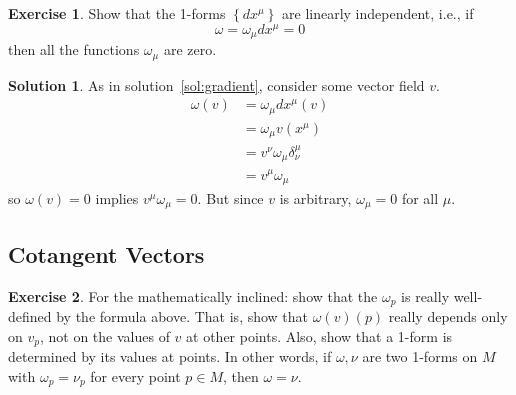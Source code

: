 \documentclass[11pt, a4paper]{article}
\theoremstyle{definition}
\newtheorem{ex}{Exercise}[part]
\newtheorem{sol}{Solution}[part]
\begin{document}
\begin{ex}

Show that the 1-forms $\left\{dx^\mu\right\}$ are linearly independent, i.e., if
\[
    \omega = \omega_\mu dx^\mu = 0
\]
then all the functions $\omega_\mu$ are zero.

\end{ex}

\begin{sol}

As in solution~\ref{sol:gradient}, consider some vector field $v$.
\begin{align*}
    \omega (v) &= \omega_\mu dx^\mu (v) \\
               &= \omega_\mu v(x^\mu) \\
               &= v^\nu \omega_\mu \delta_\nu^\mu \\
               &= v^\mu \omega_\mu
\end{align*}
so $\omega(v) = 0$ implies $v^\mu \omega_\mu = 0$. But since $v$ is arbitrary, $\omega_\mu = 0$ for all $\mu$.

\end{sol}

\subsection{Cotangent Vectors}

\begin{ex}

For the mathematically inclined: show that the $\omega_p$ is really well-defined by the formula above.
That is, show that $\omega(v)(p)$ really depends only on $v_p$, not on the values of $v$ at other points.
Also, show that a 1-form is determined by its values at points.
In other words, if $\omega, \nu$ are two 1-forms on $M$ with $\omega_p = \nu_p$ for every point $p \in M$, then $\omega = \nu$.

\end{ex}
\end{document}
